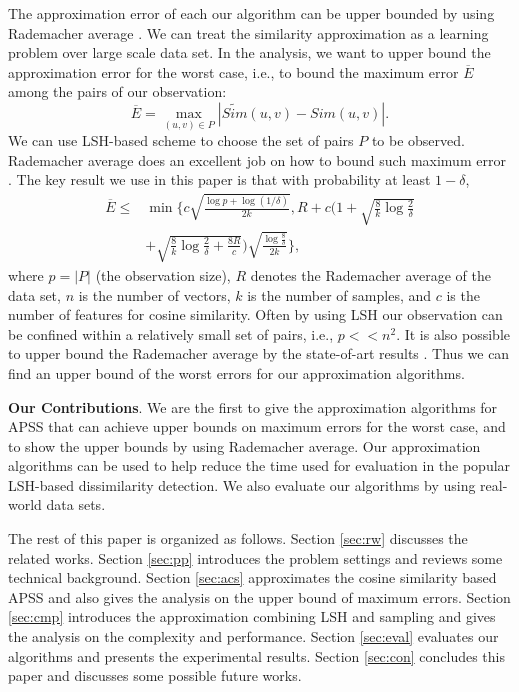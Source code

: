 \documentclass[sigconf,anonymous]{acmart}
\begin{document}
The approximation error of each our algorithm can be upper bounded by using Rademacher average \cite{BM02,Mohri09,BBM05}. We can treat the similarity approximation as a learning problem over large scale data set. In the analysis, we want to upper bound the approximation error for the worst case, i.e., to bound the maximum error $\overline{E}$ among the pairs of our observation:
$$\overline{E} = \max_{(u,v)\in P} |\widetilde{Sim}(u,v) - Sim(u,v)|.$$
{\color{black}We can use LSH-based scheme to choose the set of pairs $P$ to be observed. }
Rademacher average does an excellent job on how to bound such maximum error \cite{RU15,RU16}. The key result we use in this paper is that with probability at least $1-\delta$,
$$\begin{aligned}
\overline{E} \leq &\min\bigg\{c\sqrt{\frac{\log p + \log(1/\delta)}{2k}}, R + c\bigg(1+\sqrt{\frac{8}{k}\log \frac{2}{\delta}} \\&+ \sqrt{\frac{8}{k}\log \frac{2}{\delta} + \frac{8R}{c}}\bigg)\sqrt{\frac{\log \frac{8}{\delta}}{2k}}\bigg\},
\end{aligned}$$
where $p=|P|$ (the observation size), $R$ denotes the Rademacher average of the data set, $n$ is the number of vectors, $k$ is the number of samples, and $c$ is the number of features for cosine similarity. Often by using LSH our observation can be confined within a relatively small set of pairs, i.e., $p << n^2$. 
It is also possible to upper bound the Rademacher average by the state-of-art results \cite{AGO14,RU15,RU16}. Thus we can find an upper bound of the worst errors for our approximation algorithms.

{\color{black}
\textbf{Our Contributions}. We are the first to give the approximation algorithms for APSS that can achieve upper bounds on maximum errors for the worst case, and to show the upper bounds by using Rademacher average. Our approximation algorithms can be used to help reduce the time used for evaluation in the popular LSH-based dissimilarity detection. We also evaluate our algorithms by using real-world data sets.
}

The rest of this paper is organized as follows. Section \ref{sec:rw} discusses the related works. Section \ref{sec:pp} introduces the problem settings and reviews some technical background. Section \ref{sec:acs} approximates the cosine similarity based APSS and also gives the analysis on the upper bound of maximum errors. Section \ref{sec:cmp} introduces the approximation combining LSH and sampling and gives the analysis on the complexity and performance. Section \ref{sec:eval} evaluates our algorithms and presents the experimental results. Section \ref{sec:con} concludes this paper and discusses some possible future works.
\end{document}
